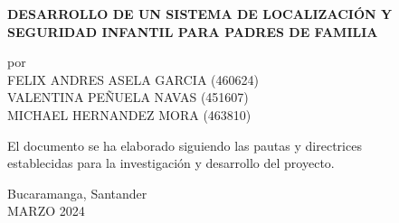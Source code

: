 \documentclass[12pt,onehalfspacing]{report}
\begin{document}
\thispagestyle{empty}
\begin{center}
  {\large \MakeUppercase{\textbf{DESARROLLO DE UN SISTEMA DE LOCALIZACIÓN Y SEGURIDAD INFANTIL PARA PADRES DE FAMILIA}}}

  \vspace{1in}

  por \\
  FELIX ANDRES ASELA GARCIA (460624)\\
  VALENTINA PEÑUELA NAVAS (451607)\\
  MICHAEL HERNANDEZ MORA (463810)

  \vspace{1.5in}

  El documento se ha elaborado siguiendo las pautas y directrices\\ establecidas para la investigación y desarrollo del proyecto.

  \vspace{2in}

  Bucaramanga, Santander\\       %
  MARZO 2024                  %
\end{center}

\renewcommand{\contentsname}{Tabla de contenido}
\tableofcontents
\clearpage
\end{document}
